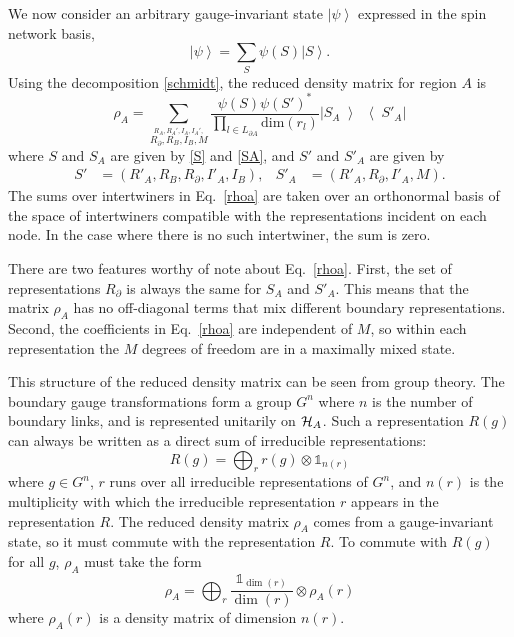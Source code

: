 \documentclass[aps,prd,twocolumn,showpacs,groupedaddress,nofootinbib,letterpaper]{revtex4}
\newcommand{\ket}[1]{\left\vert#1\right\rangle}
\newcommand{\ketbra}[2]{\left|#1\middle\rangle \! \middle\langle#2\right|}
\begin{document}
We now consider an arbitrary gauge-invariant state $\ket{\psi}$ expressed in the spin network basis,
\begin{equation}
\ket{\psi} = \sum_S \psi(S) \ket{S}.
\end{equation}
Using the decomposition \eqref{schmidt}, the reduced density matrix for region $A$ is
\begin{equation} \label{rhoa}
\rho_A = \sum_{\stackrel{R_A,R_A',I_A, I_A', }{R_{\partial},R_B, I_B, M}} 
\frac
{\psi(S) \psi(S')^*}
{\prod_{l \in L_{\partial A}} \text{dim}(r_l) } 
\ketbra{S_A}{S'_A}
\end{equation}
where $S$ and $S_A$ are given by \eqref{S} and \eqref{SA}, and $S'$ and $S'_A$ are given by
\begin{align}
S' &= (R'_A, R_B, R_{\partial}, I'_A, I_B), & S'_A &= (R'_A, R_{\partial}, I'_A, M).
\end{align}
The sums over intertwiners in Eq.~\eqref{rhoa} are taken over an orthonormal basis of the space of intertwiners compatible with the representations incident on each node. 
In the case where there is no such intertwiner, the sum is zero.

There are two features worthy of note about Eq.~\eqref{rhoa}.
First, the set of representations $R_{\partial}$ is always the same for $S_A$ and $S'_A$.
This means that the matrix $\rho_A$ has no off-diagonal terms that mix different boundary representations.
Second, the coefficients in Eq.~\eqref{rhoa} are independent of $M$, so within each representation the $M$ degrees of freedom are in a maximally mixed state.

This structure of the reduced density matrix can be seen from group theory.
The boundary gauge transformations form a group $G^n$ where $n$ is the number of boundary links, and is represented unitarily on ${\cal H}_A$.
Such a representation $R(g)$ can always be written as a direct sum of irreducible representations:
\begin{equation} \label{u}
R(g) = \bigoplus_r r(g) \otimes \mathbb{1}_{n(r)}
\end{equation}
where $g \in G^n$, $r$ runs over all irreducible representations of $G^n$, and $n(r)$ is the multiplicity with which the irreducible representation $r$ appears in the representation $R$.
The reduced density matrix $\rho_A$ comes from a gauge-invariant state, so it must commute with the representation $R$.
To commute with $R(g)$ for all $g$, $\rho_A$ must take the form
\begin{equation}
\rho_A = \bigoplus_r \frac{\mathbb{1}_{\dim(r)}}{\dim(r)} \otimes \rho_A(r)
\end{equation}
where $\rho_A(r)$ is a density matrix of dimension $n(r)$.
\end{document}
